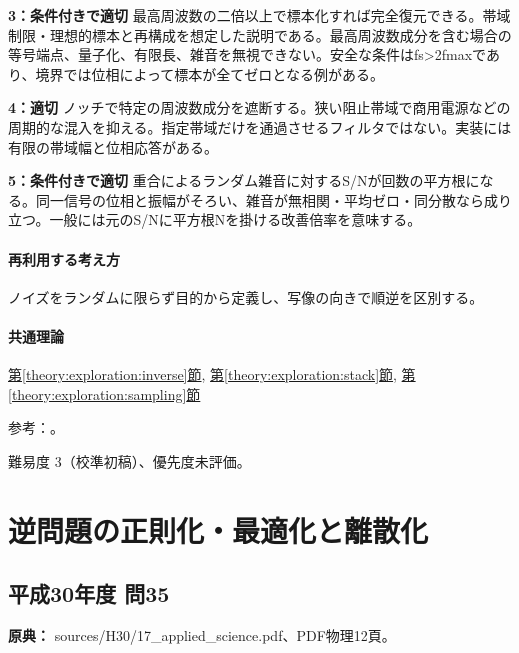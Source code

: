 \noindent\textbf{3：条件付きで適切} 最高周波数の二倍以上で標本化すれば完全復元できる。帯域制限・理想的標本と再構成を想定した説明である。最高周波数成分を含む場合の等号端点、量子化、有限長、雑音を無視できない。安全な条件はfs>2fmaxであり、境界では位相によって標本が全てゼロとなる例がある。\par

\noindent\textbf{4：適切} ノッチで特定の周波数成分を遮断する。狭い阻止帯域で商用電源などの周期的な混入を抑える。指定帯域だけを通過させるフィルタではない。実装には有限の帯域幅と位相応答がある。\par

\noindent\textbf{5：条件付きで適切} 重合によるランダム雑音に対するS/Nが回数の平方根になる。同一信号の位相と振幅がそろい、雑音が無相関・平均ゼロ・同分散なら成り立つ。一般には元のS/Nに平方根Nを掛ける改善倍率を意味する。\par

\paragraph{再利用する考え方} ノイズをランダムに限らず目的から定義し、写像の向きで順逆を区別する。

\paragraph{共通理論} \hyperref[theory:exploration:inverse]{第\ref*{theory:exploration:inverse}節}, \hyperref[theory:exploration:stack]{第\ref*{theory:exploration:stack}節}, \hyperref[theory:exploration:sampling]{第\ref*{theory:exploration:sampling}節}

\par 参考：\cite{mit_signals2010,mit_moving2012,scipy_notch,scipy_fft,usgs_processing2000,pygimli_inversion}。

\par 難易度 3（校準初稿）、優先度未評価。

\section{逆問題の正則化・最適化と離散化}

\subsection{平成30年度 問35}
\label{q:h30-reg-applied-35}

\noindent\textbf{原典：} sources/H30/17\_applied\_science.pdf、PDF物理12頁。

